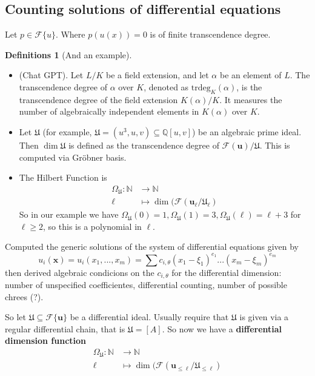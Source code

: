 \documentclass{article}
\theoremstyle{definition}
\newtheorem*{defns}{Definitions}
\newcommand{\N}{\mathbb{N}}
\newcommand{\Q}{\mathbb{Q}}
\begin{document}
\subsection{Counting solutions of differential equations}
Let $p\in\mathcal F\{u\}$. Where $p(u(x)) =0$ is of finite transcendence degree.
\begin{defns}[And an example]\leavevmode
\begin{itemize}
    \item     (Chat GPT). Let $L/K$ be a field extension, and let $\alpha$ be an element of $L$. The transcendence degree of $\alpha$ over $K$, denoted as $\text{trdeg}_K(\alpha)$, is the transcendence degree of the field extension $K(\alpha)/K$. It measures the number of algebraically independent elements in $K(\alpha)$ over $K$.
    
    \item     Let $\mathfrak U$ (for example, $\mathfrak U=(u^3,u,v)\subseteq \Q[u,v]$) be an algebraic prime ideal. Then $\dim \mathfrak U $ is defined as the transcendence degree of $\mathcal{F}(\mathbf{u})/\mathfrak U$. This is computed via Gröbner basis.

    \item The Hilbert Function is
    \begin{align*}
        \Omega_{\mathfrak U}:\N&\to\N\\
        \ell&\mapsto \dim(\mathcal F(\mathbf{u}_\ell/\mathfrak U_\ell)
    \end{align*}
    So in our example we have $\Omega_{\mathfrak U}(0)=1,\Omega_{\mathfrak U}(1)=3,\Omega_{\mathfrak U}(\ell)=\ell+3$ for $\ell\geq2$, so this is a polynomial in $\ell$.
\end{itemize}
\end{defns}
Computed the generic solutions of the system of differential equations given by
$$u_i(\mathbf{x})=u_i(x_1,...,x_m)=\sum c_{i,\theta}(x_1-\xi_1)^{e_1}...(x_m-\xi_m)^{e_m}$$
then derived algebraic condicions on the $c_{i,\theta}$ for the differential dimension: number of unspecified coefficientes, differential counting, number of possible chrees (?).\par
So let $\mathfrak U\subseteq \mathcal F\{\mathbf{u}\}$ be a differential ideal. Usually require that $\mathfrak U$ is given via a regular differential chain, that is $\mathfrak U=[A]$. So now we have a \textbf{differential dimension function}
    \begin{align*}
        \Omega_{\mathfrak U}:\N&\to\N\\
        \ell&\mapsto \dim(\mathcal F(\mathbf{u}_{\leq\ell}/\mathfrak U_{\leq\ell})
    \end{align*}
\end{document}
